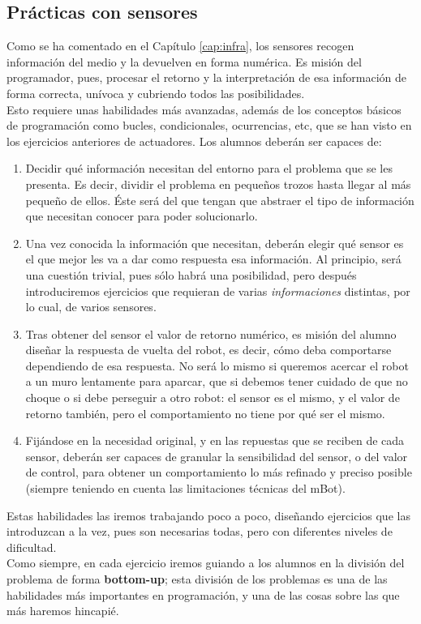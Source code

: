 \subsection{Prácticas con sensores} \label{subsec:practicassensores}
Como se ha comentado en el Capítulo \ref{cap:infra}, los sensores recogen información del medio y la devuelven en forma numérica. Es misión del programador, pues, procesar el retorno y la interpretación de esa información de forma correcta, unívoca y cubriendo todos las posibilidades. \\
Esto requiere unas habilidades más avanzadas, además de los conceptos básicos de programación como bucles, condicionales, ocurrencias, etc, que se han visto en los ejercicios anteriores de actuadores. Los alumnos deberán ser capaces de:
\begin{enumerate}
	\item Decidir qué información necesitan del entorno para el problema que se les presenta. Es decir, dividir el problema en pequeños trozos hasta llegar al más pequeño de ellos. Éste será del que tengan que abstraer el tipo de información que necesitan conocer para poder solucionarlo.
	\item Una vez conocida la información que necesitan, deberán elegir qué sensor es el que mejor les va a dar como respuesta esa información. Al principio, será una cuestión trivial, pues sólo habrá una posibilidad, pero después introduciremos ejercicios que requieran de varias \textit{informaciones} distintas, por lo cual, de varios sensores.
	\item Tras obtener del sensor el valor de retorno numérico, es misión del alumno diseñar la respuesta de vuelta del robot, es decir, cómo deba comportarse dependiendo de esa respuesta. No será lo mismo si queremos acercar el robot a un muro lentamente para aparcar, que si debemos tener cuidado de que no choque o si debe perseguir a otro robot: el sensor es el mismo, y el valor de retorno también, pero el comportamiento no tiene por qué ser el mismo. 	
	\item Fijándose en la necesidad original, y en las repuestas que se reciben de cada sensor, deberán ser capaces de granular la sensibilidad del sensor, o del valor de control, para obtener un comportamiento lo más refinado y preciso posible (siempre teniendo en cuenta las limitaciones técnicas del mBot).
\end{enumerate}

Estas habilidades las iremos trabajando poco a poco, diseñando ejercicios que las introduzcan a la vez, pues son necesarias todas, pero con diferentes niveles de dificultad.\\
Como siempre, en cada ejercicio iremos guiando a los alumnos en la división del problema de forma \textbf{bottom-up}; esta división de los problemas es una de las habilidades más importantes en programación, y una de las cosas sobre las que más haremos hincapié.

